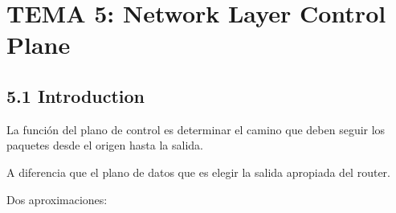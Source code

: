 \documentclass[12pt, twoside, openright]{report} %
\begin{document}
\chapter{TEMA 5: Network Layer Control Plane}

\section{5.1 Introduction}

 

    La función del plano de control es determinar el camino que deben
    seguir los paquetes desde el origen hasta la salida.

	A diferencia que el plano de datos que es elegir la salida apropiada
    del router.

	Dos aproximaciones:
\end{document}

